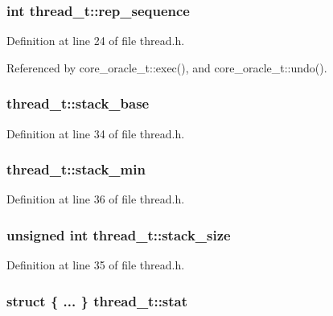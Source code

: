 \subsubsection[{rep\_\-sequence}]{\setlength{\rightskip}{0pt plus 5cm}int {\bf thread\_\-t::rep\_\-sequence}}\label{structthread__t_d907b780c1717ccfc70ddc4c6f56d17b}




Definition at line 24 of file thread.h.

Referenced by core\_\-oracle\_\-t::exec(), and core\_\-oracle\_\-t::undo().
\subsubsection[{stack\_\-base}]{ {\bf thread\_\-t::stack\_\-base}}\label{structthread__t_43ed6f4ff6654b32c1f2c51ee9bd5c0c}




Definition at line 34 of file thread.h.
\subsubsection[{stack\_\-min}]{ {\bf thread\_\-t::stack\_\-min}}\label{structthread__t_61cec3b38f6d5b3f349792b3b2953f3d}




Definition at line 36 of file thread.h.
\subsubsection[{stack\_\-size}]{\setlength{\rightskip}{0pt plus 5cm}unsigned int {\bf thread\_\-t::stack\_\-size}}\label{structthread__t_74eafa6a2f3dbcef60499e781c5ee524}




Definition at line 35 of file thread.h.
\subsubsection[{stat}]{\setlength{\rightskip}{0pt plus 5cm}struct \{ ... \}   {\bf thread\_\-t::stat}}\label{structthread__t_9ec7f775f2b8390dc4088ee1c40d9cc3}




